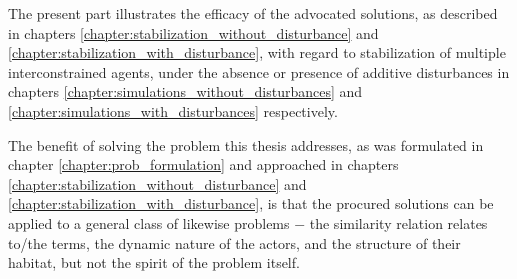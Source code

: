 The present part illustrates the efficacy of the advocated solutions, as
described in chapters \ref{chapter:stabilization_without_disturbance} and
\ref{chapter:stabilization_with_disturbance}, with regard to stabilization
of multiple interconstrained agents, under the absence or presence
of additive disturbances in chapters
\ref{chapter:simulations_without_disturbances} and
\ref{chapter:simulations_with_disturbances} respectively.

The benefit of solving the problem this thesis addresses, as was formulated in
chapter \ref{chapter:prob_formulation} and approached in chapters
\ref{chapter:stabilization_without_disturbance} and
\ref{chapter:stabilization_with_disturbance}, is that the procured solutions can
be applied to a general class of likewise problems $-$ the similarity relation
relates to/the terms, the dynamic nature of the actors, and the structure of
their habitat, but not the spirit of the problem itself.

